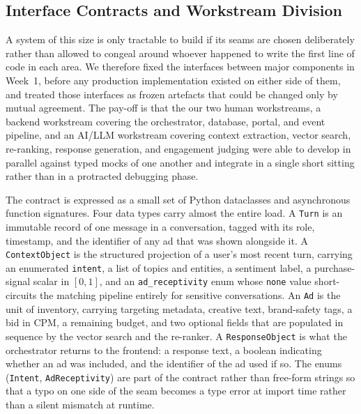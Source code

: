 \subsection{Interface Contracts and Workstream Division}
\label{subsec:interface-contracts}

A system of this size is only tractable to build if its seams are chosen
deliberately rather than allowed to congeal around whoever happened to
write the first line of code in each area. We therefore fixed the
interfaces between major components in Week~1, before any production
implementation existed on either side of them, and treated those
interfaces as frozen artefacts that could be changed only by mutual
agreement. The pay-off is that the our two human workstreams, a backend
workstream covering the orchestrator, database, portal, and event
pipeline, and an AI/LLM workstream covering context extraction, vector
search, re-ranking, response generation, and engagement judging 
were able to develop in parallel against typed mocks of one another and
integrate in a single short sitting rather than in a protracted
debugging phase.

The contract is expressed as a small set of Python dataclasses and
asynchronous function signatures. Four data types carry almost the
entire load. A \texttt{Turn} is an immutable record of one message in a
conversation, tagged with its role, timestamp, and the identifier of
any ad that was shown alongside it. A \texttt{ContextObject} is the
structured projection of a user's most recent turn, carrying an
enumerated \texttt{intent}, a list of topics and entities, a sentiment
label, a purchase-signal scalar in $[0,1]$, and an \texttt{ad\_receptivity}
enum whose \texttt{none} value short-circuits the matching pipeline
entirely for sensitive conversations. An \texttt{Ad} is the unit of
inventory, carrying targeting metadata, creative text, brand-safety
tags, a bid in CPM, a remaining budget, and two optional fields that are populated in
sequence by the vector search and the re-ranker. A
\texttt{ResponseObject} is what the orchestrator returns to the
frontend: a response text, a boolean indicating whether an ad was
included, and the identifier of the ad used if so. The enums
(\texttt{Intent}, \texttt{AdReceptivity}) are part of the contract
rather than free-form strings so that a typo on one side of the seam
becomes a type error at import time rather than a silent mismatch at
runtime.

